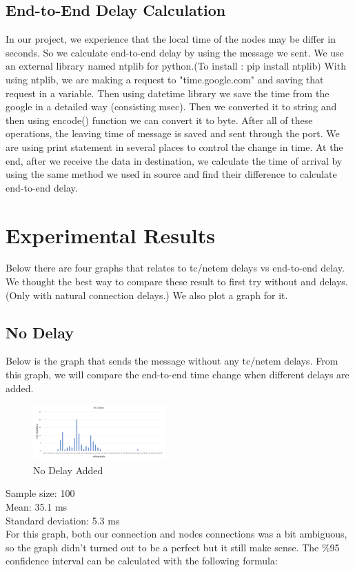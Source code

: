 \documentclass[conference]{IEEEtran}
\begin{document}
\subsection{End-to-End Delay Calculation}

In our project, we experience that the local time of the nodes may be differ in seconds. So we calculate end-to-end delay by using the message we sent. We use an external library named ntplib for python.(To install : pip install ntplib) With using ntplib, we are making a request to "time.google.com" and saving that request in a variable. Then using datetime library we save the time from the google in a detailed way (consisting msec). Then we converted it to string and then using encode() function we can convert it to byte. After all of these operations, the leaving time of message is saved and sent through the port. We are using print statement in several places to control the change in time. At the end, after we receive the data in destination, we calculate the time of arrival by using the same method we used in source and find their difference to calculate end-to-end delay.

\section{Experimental Results}
Below there are four graphs that relates to tc/netem delays vs end-to-end delay. We thought the best way to compare these result to first try without and delays. (Only with natural connection delays.) We also plot a graph for it. 


\subsection{No Delay}

Below is the graph that sends the message without any tc/netem delays. From this graph, we will compare the end-to-end time change when different delays are added.

\begin{figure}[h]
\includegraphics[width=0.45\textwidth]{No_Delay.png}
\caption{No Delay Added}
\label{fig:figure2}
\end{figure}
Sample size: 100 \\
Mean: 35.1 ms \\
Standard deviation: 5.3 ms \\
For this graph, both our connection and nodes connections was a bit ambiguous, so the graph didn't turned out to be a perfect but it still make sense. The \%95 confidence interval can be calculated with the following formula:
\end{document}
